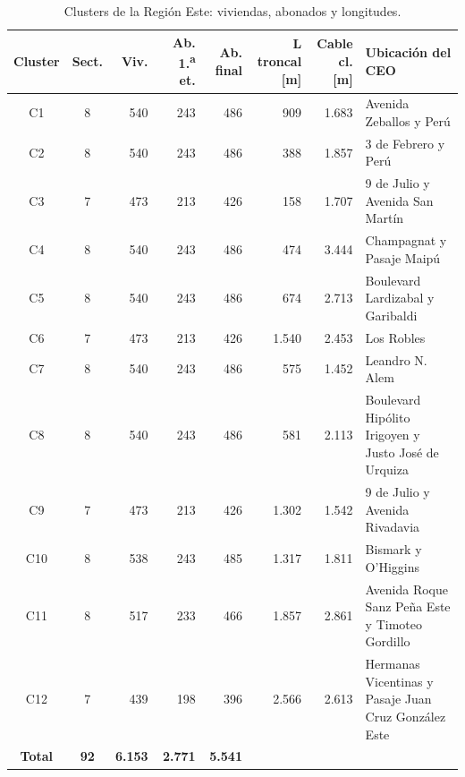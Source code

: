 \begin{table}[H]\centering\footnotesize
\caption{Clusters de la Región Este: viviendas, abonados y longitudes.}\label{tab:clusters}
\setlength{\tabcolsep}{3pt}\begin{tabular}{|c|c|r|r|r|r|r|p{3.6cm}|}\hline \textbf{Cluster} & \textbf{Sect.} & \textbf{Viv.} & \textbf{Ab. 1.\textsuperscript{a} et.} & \textbf{Ab. final} & \textbf{L troncal [m]} & \textbf{Cable cl. [m]} & \textbf{Ubicación del CEO} \\ \hline
C1 & 8 & 540 & 243 & 486 & 909 & 1.683 & Avenida Zeballos y Perú \\ \hline
C2 & 8 & 540 & 243 & 486 & 388 & 1.857 & 3 de Febrero y Perú \\ \hline
C3 & 7 & 473 & 213 & 426 & 158 & 1.707 & 9 de Julio y Avenida San Martín \\ \hline
C4 & 8 & 540 & 243 & 486 & 474 & 3.444 & Champagnat y Pasaje Maipú \\ \hline
C5 & 8 & 540 & 243 & 486 & 674 & 2.713 & Boulevard Lardizabal y Garibaldi \\ \hline
C6 & 7 & 473 & 213 & 426 & 1.540 & 2.453 & Los Robles \\ \hline
C7 & 8 & 540 & 243 & 486 & 575 & 1.452 & Leandro N. Alem \\ \hline
C8 & 8 & 540 & 243 & 486 & 581 & 2.113 & Boulevard Hipólito Irigoyen y Justo José de Urquiza \\ \hline
C9 & 7 & 473 & 213 & 426 & 1.302 & 1.542 & 9 de Julio y Avenida Rivadavia \\ \hline
C10 & 8 & 538 & 243 & 485 & 1.317 & 1.811 & Bismark y O'Higgins \\ \hline
C11 & 8 & 517 & 233 & 466 & 1.857 & 2.861 & Avenida Roque Sanz Peña Este y Timoteo Gordillo \\ \hline
C12 & 7 & 439 & 198 & 396 & 2.566 & 2.613 & Hermanas Vicentinas y Pasaje Juan Cruz González Este \\ \hline
\textbf{Total} & \textbf{92} & \textbf{6.153} & \textbf{2.771} & \textbf{5.541} & \multicolumn{3}{l|}{} \\ \hline
\end{tabular}\end{table}
